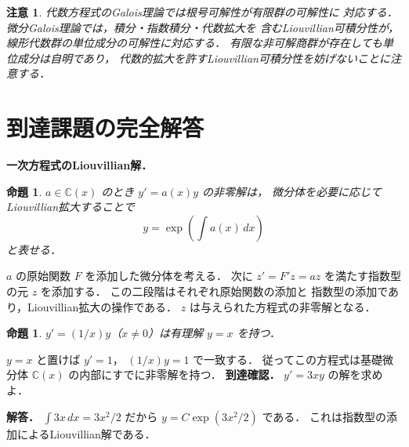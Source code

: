 \documentclass[a5paper,10pt,onecolumn]{jsarticle}
\makeatletter
\theoremstyle{mathnotetheorem}
\newtheorem{proposition}[theorem]{命題}
\newtheorem{remark}[theorem]{注意}
\renewcommand{\proofname}{証明}
\renewenvironment{proof}[1][\proofname]{%
  \par\pushQED{\qed}\normalfont\topsep4\p@\@plus2\p@\relax
  \trivlist\item[\hskip\labelsep\bfseries #1]\ignorespaces
}{\popQED\endtrivlist\@endpefalse}
\makeatother
\begin{document}
\begin{remark}
代数方程式のGalois理論では根号可解性が有限群の可解性に
対応する．微分Galois理論では，積分・指数積分・代数拡大を
含むLiouvillian可積分性が，
線形代数群の\emph{単位成分}の可解性に対応する．
有限な非可解商群が存在しても単位成分は自明であり，
代数的拡大を許すLiouvillian可積分性を妨げないことに注意する．
\end{remark}

\section{到達課題の完全解答}
\noindent\textbf{一次方程式のLiouvillian解．}
\begin{proposition}
$a\in\mathbb C(x)$ のとき
$y'=a(x)y$ の非零解は，
微分体を必要に応じてLiouvillian拡大することで
\[
y=\exp\left(\int a(x)\,dx\right)
\]
と表せる．
\end{proposition}
\begin{proof}
$a$ の原始関数 $F$ を添加した微分体を考える．
次に $z'=F'z=az$ を満たす指数型の元 $z$ を添加する．
この二段階はそれぞれ原始関数の添加と
指数型の添加であり，Liouvillian拡大の操作である．
$z$ は与えられた方程式の非零解となる．
\end{proof}
\begin{proposition}
$y'=(1/x)y$（$x\ne0$）は有理解 $y=x$ を持つ．
\end{proposition}
\begin{proof}
$y=x$ と置けば $y'=1$，
$(1/x)y=1$ で一致する．
従ってこの方程式は基礎微分体 $\mathbb C(x)$
の内部にすでに非零解を持つ．
\end{proof}
\noindent\textbf{到達確認．}
$y'=3xy$ の解を求めよ．
\par\noindent\textbf{解答．}
$\int3x\,dx=3x^2/2$ だから
$y=C\exp(3x^2/2)$ である．
これは指数型の添加によるLiouvillian解である．
\end{document}
